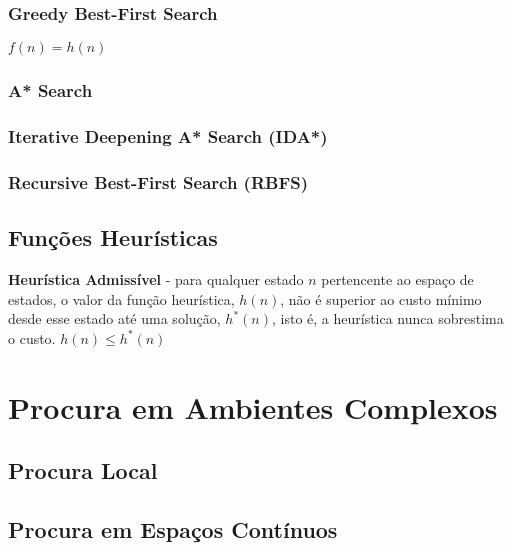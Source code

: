 \documentclass[12pt]{article}
\begin{document}
\subsubsection{Greedy Best-First Search}

$f(n) = h(n)$

\subsubsection{A* Search}



\subsubsection{Iterative Deepening A* Search (IDA*)}



\subsubsection{Recursive Best-First Search (RBFS)}


\newpage

\subsection{Funções Heurísticas}



\textbf{Heurística Admissível} - para qualquer estado $n$ pertencente ao espaço de estados, o valor da função heurística, $h(n)$, não é superior ao custo mínimo desde esse estado até uma solução, $h^*(n)$, isto é, a heurística nunca sobrestima o custo. $h(n)\leq h^*(n)$

\newpage

\section{Procura em Ambientes Complexos}



\subsection{Procura Local}



\subsection{Procura em Espaços Contínuos}
\end{document}

